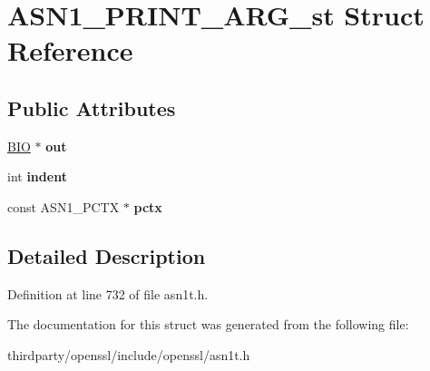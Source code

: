 \hypertarget{struct_a_s_n1___p_r_i_n_t___a_r_g__st}{}\section{A\+S\+N1\+\_\+\+P\+R\+I\+N\+T\+\_\+\+A\+R\+G\+\_\+st Struct Reference}
\label{struct_a_s_n1___p_r_i_n_t___a_r_g__st}
\subsection*{Public Attributes}
\begin{DoxyCompactItemize}
\item 
\mbox{\label{struct_a_s_n1___p_r_i_n_t___a_r_g__st_a238eca48eea38372c40de60fbdc4d4ee}} 
\hyperlink{structbio__st}{B\+IO} $\ast$ {\bfseries out}
\item 
\mbox{\label{struct_a_s_n1___p_r_i_n_t___a_r_g__st_a62f3360ea4704ea92e62e0a4c28d238f}} 
int {\bfseries indent}
\item 
\mbox{\label{struct_a_s_n1___p_r_i_n_t___a_r_g__st_a6ef7daafd5db8eeb310b27206b3b243a}} 
const A\+S\+N1\+\_\+\+P\+C\+TX $\ast$ {\bfseries pctx}
\end{DoxyCompactItemize}


\subsection{Detailed Description}


Definition at line 732 of file asn1t.\+h.



The documentation for this struct was generated from the following file\+:\begin{DoxyCompactItemize}
\item 
thirdparty/openssl/include/openssl/asn1t.\+h\end{DoxyCompactItemize}
